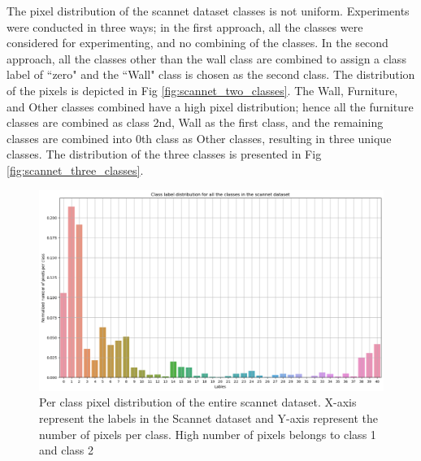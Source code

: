	The pixel distribution of the scannet dataset classes is not uniform. Experiments were conducted in three ways; in the first approach, all the classes were considered for experimenting, and no combining of the classes. In the second approach, all the classes other than the wall class are combined to assign a class label of ``zero" and the ``Wall" class is chosen as the second class. The distribution of the pixels is depicted in Fig \ref{fig:scannet_two_classes}.
	The Wall, Furniture, and Other classes combined have a high pixel distribution; hence all the furniture classes are combined as class 2nd, Wall as the first class, and the remaining classes are combined into 0th class as Other classes, resulting in three unique classes. The distribution of the three classes is presented in Fig \ref{fig:scannet_three_classes}.
    
    \begin{figure}
    	\centering
    	\includegraphics[width=13cm]{images/scannet_data_class_distribution.png}
    	\caption{Per class pixel distribution of the entire scannet dataset. X-axis represent the labels in the Scannet dataset and Y-axis represent the number of pixels per class. High number of pixels belongs to class 1 and class 2}
    	\label{fig:scannet_class}
    \end{figure} 
    
